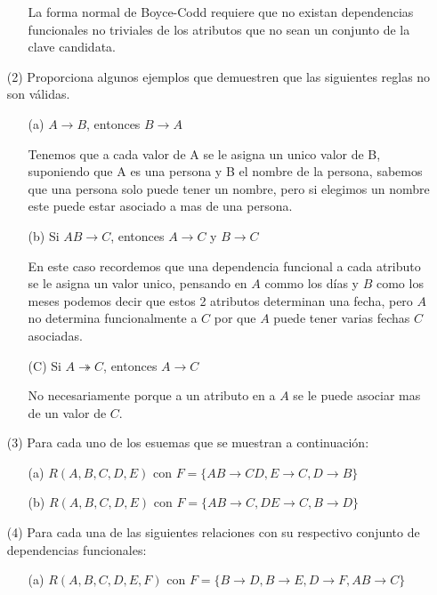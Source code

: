 \documentclass{article}
\begin{document}
\begin{enumerate}
\begin{enumerate}
      La forma normal de Boyce-Codd requiere que no existan dependencias
      funcionales no triviales de los atributos que no sean un conjunto de la
      clave candidata.
    \end{enumerate}
  \item[(2)] Proporciona algunos ejemplos que demuestren que las siguientes reglas
  no son válidas.
    \begin{enumerate}
      \item[(a)] $A \rightarrow B$, entonces $B \rightarrow A$

      Tenemos que a cada valor de A se le asigna un unico valor de B,
      suponiendo que A es una persona y B el nombre de la persona, sabemos que una
      persona solo puede tener un nombre, pero si elegimos un nombre este puede
      estar asociado a mas de una persona.
      \item[(b)] Si $AB \rightarrow C$, entonces $A \rightarrow C$ y $B \rightarrow C$

      En este caso recordemos que una dependencia funcional a cada atributo se le
      asigna un valor unico, pensando en $A$ commo los días y $B$ como los meses
      podemos decir que estos 2 atributos determinan una fecha, pero $A$ no
      determina funcionalmente a $C$ por que $A$ puede tener varias fechas $C$
      asociadas.

      \item[(C)] Si $A \twoheadrightarrow C$, entonces $A \rightarrow C$

      No necesariamente porque a un atributo en a $A$ se le puede asociar mas de
      un valor de $C$.

    \end{enumerate}
    \item[(3)] Para cada uno de los esuemas que se muestran a continuación:
      \begin{enumerate}
        \item[(a)] $R(A,B,C,D,E)$ con $F=\{ AB \rightarrow CD, E \rightarrow C
        ,D \rightarrow B \}$
        \item[(b)] $R(A,B,C,D,E)$ con $F= \{ AB \rightarrow C, DE \rightarrow C,
        B \rightarrow D \}$
      \end{enumerate}
    \item[(4)] Para cada una de las siguientes relaciones con su respectivo
    conjunto de dependencias funcionales:
      \begin{enumerate}
        \item[(a)] $R(A,B,C,D,E,F)$ con $F = \{B\rightarrow D, B \rightarrow E,
        D \rightarrow F, AB \rightarrow C\}$


\end{enumerate}
\end{enumerate}
\end{document}
